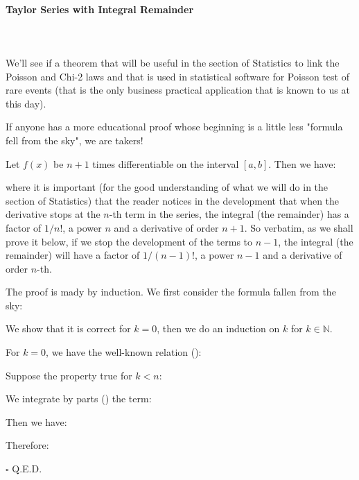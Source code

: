 	\paragraph{Taylor Series with Integral Remainder}\mbox{}\\\\
	We'll see if a theorem that will be useful in the section of Statistics to link the Poisson and Chi-2 laws and that is used in statistical software for Poisson test of rare events (that is the only business practical application that is known to us at this day).
	\begin{tcolorbox}[title=Remark,colframe=black,arc=10pt]
	If anyone has a more educational proof whose beginning is a little less "formula fell from the sky", we are takers!
	\end{tcolorbox}
	\begin{theorem}
	Let $f(x)$ be $n + 1$ times differentiable on the interval $[a, b]$. Then we have:
	
	where it is important (for the good understanding of what we will do in the section of Statistics) that the reader notices in the development that when the derivative stops at the $n$-th term in the series, the integral (the remainder) has a factor of $1 / n !$, a power $n$ and a derivative of order $n + 1$. So verbatim, as we shall prove it below, if we stop the development of the terms to $n-1$, the integral (the remainder) will have a factor of $1 / (n-1) !$, a power $n-1$ and a derivative of order $n$-th.
	\end{theorem}
	\begin{dem}
	The proof is mady by induction. We first consider the formula fallen from the sky:
	
	We show that it is correct for $k = 0$, then we do an induction on $k$ for $k\in \mathbb{N}$.
	
	For $k = 0$, we have the well-known relation ():
	
	Suppose the property true for $k<n$:
	
	We integrate by parts () the term:
	
	Then we have:
	
	Therefore:
	
	\begin{flushright}
		$\square$  Q.E.D.
	\end{flushright}
	\end{dem}
	
